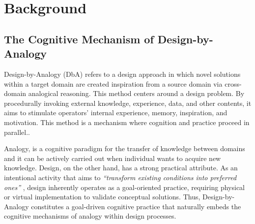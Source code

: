 \section{Background}

\subsection{The Cognitive Mechanism of Design-by-Analogy}
Design-by-Analogy (DbA) refers to a design approach in which novel solutions within a target domain are created inspiration from a source domain via cross-domain analogical reasoning.\cite{jiang2022data, fu2014bio} This method centers around a design problem. By procedurally invoking external knowledge, experience, data, and other contents, it aims to stimulate operators' internal experience, memory, inspiration, and motivation. This method is a mechanism where cognition and practice proceed in parallel.\cite{moreno2015step, schecter2025role}.

Analogy, is a cognitive paradigm for the transfer of knowledge between domains\cite{gentner1983structure, hofstadter2001analogy} and it can be actively carried out when individual wants to acquire new knowledge\cite{gentner1997reasoning}. Design, on the other hand, has a strong practical attribute. As an intentional activity that aims to \textit{``transform existing conditions into preferred ones''} \cite{simon2019sciences}, design inherently operates as a goal-oriented practice, requiring physical or virtual implementation to validate conceptual solutions. Thus, Design-by-Analogy constitutes a goal-driven cognitive practice that naturally embeds the cognitive mechanisms of analogy within design processes. 

